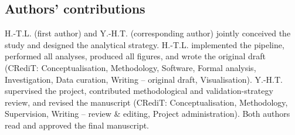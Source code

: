 \subsection*{Authors' contributions}
H.-T.L. (first author) and Y.-H.T. (corresponding author) jointly
conceived the study and designed the analytical strategy. H.-T.L.
implemented the pipeline, performed all analyses, produced all
figures, and wrote the original draft (CRediT: Conceptualisation,
Methodology, Software, Formal analysis, Investigation, Data curation,
Writing -- original draft, Visualisation). Y.-H.T. supervised the
project, contributed methodological and validation-strategy review,
and revised the manuscript (CRediT: Conceptualisation, Methodology,
Supervision, Writing -- review \& editing, Project administration).
Both authors read and approved the final manuscript.

